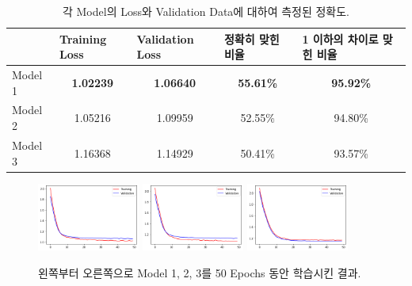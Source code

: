 \documentclass[letterpaper,10pt]{article}
\begin{document}
	\begin{table}
		\centering
		\begin{tabular}{l|cc|cc}
			\hline
			\textbf{} & \multicolumn{1}{l}{\textbf{Training Loss}} & \multicolumn{1}{l|}{\textbf{Validation Loss}} & \multicolumn{1}{l}{\textbf{정확히 맞힌 비율}} & \multicolumn{1}{l}{\textbf{1 이하의 차이로 맞힌 비율}} \\ \hline
			Model 1   & \textbf{1.02239}                           & \textbf{1.06640}                              & \textbf{55.61\%}                       & \textbf{95.92\%}                             \\ \hline
			Model 2   & 1.05216                                    & 1.09959                                       & 52.55\%                                & 94.80\%                                      \\ \hline
			Model 3   & 1.16368                                    & 1.14929                                       & 50.41\%                                & 93.57\%                                      \\ \hline
		\end{tabular}
		\caption{각 Model의 Loss와 Validation Data에 대하여 측정된 정확도.}
		\label{tab:results}
	\end{table}
	
	\begin{figure}
		\centering
		\includegraphics[width=0.3\textwidth]{images/loss1.png}
		\hfill
		\includegraphics[width=0.3\textwidth]{images/loss2.png}
		\hfill
		\includegraphics[width=0.3\textwidth]{images/loss3.png}
		\caption{왼쪽부터 오른쪽으로 Model 1, 2, 3를 50 Epochs 동안 학습시킨 결과.}
		\label{fig:results}
	\end{figure}
	
\end{document}
